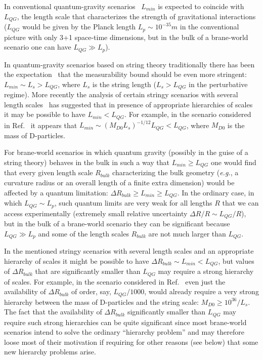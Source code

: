 In conventional quantum-gravity 
scenarios~\cite{wheely,padma,dharam94grf,gacmpla}
$L_{min}$ is expected to coincide with $L_{QG}$,
the length scale that characterizes the strength
of gravitational interactions ($L_{QG}$ would be given by the
Planck length $L_p \sim 10^{-35}m$
in the conventional picture with only 3+1
space-time dimensions, but in the bulk of a brane-world scenario
one can have $L_{QG} \gg L_p$).

In quantum-gravity scenarios based on string theory
traditionally there has been the expectation~\cite{venekonmen}  
that the measurability bound should be even more
stringent: $L_{min} \sim L_s > L_{QG}$,
where $L_s$ is the string length ($L_s > L_{QG}$ in the 
perturbative regime).
More recently the analysis of certain stringy scenarios
with several length scales~\cite{dbrscatt}  
has suggested that in presence of appropriate hierarchies
of scales it may be possible to have
$L_{min} < L_{QG}$.
For example, in the scenario considered in Ref.~\cite{dbrscatt}
it appears that $L_{min} \sim (M_{D0} L_s)^{-1/12} L_{QG} < L_{QG}$,
where $M_{D0}$ is the mass of D-particles.

For brane-world scenarios in which quantum gravity 
(possibly in the guise of a string theory) 
behaves in the bulk in such a way that
$L_{min} \ge L_{QG}$
one would find that 
every given length scale $R_{bulk}$ characterizing the bulk geometry
({\it e.g.}, a curvature radius or an overall length of a finite
extra dimension)
would be affected by a quantum 
limitation: $\Delta R_{bulk} \ge L_{min} \ge L_{QG}$.
In the ordinary case, in which $L_{QG} \sim L_p$,
such quantum limits are very weak
for all lengths $R$ that we can access experimentally
(extremely small relative uncertainty $\Delta R/R \sim L_{QG}/R$),
but in the bulk of a brane-world scenario they can be significant
because $L_{QG} \gg L_p$ and some
of the length
scales $R_{bulk}$ are not much larger than $L_{QG}$.

In the mentioned stringy scenarios with several length scales
and an appropriate hierarchy of scales 
it might be possible to have
$\Delta R_{bulk} \sim L_{min} < L_{QG}$,
but values of $\Delta R_{bulk}$ that are significantly
smaller than $L_{QG}$ may require a strong hierarchy of scales.
For example, in the scenario considered in Ref.~\cite{dbrscatt}
even just the availability of $\Delta R_{bulk}$ of order, say,
$L_{QG}/1000$, would already require a very strong hierarchy
between the mass of D-particles and the string scale:
$M_{D0} \ge 10^{36}/L_s$.
The fact that the availability of $\Delta R_{bulk}$
significantly smaller than $L_{QG}$ may require such strong
hierarchies can be quite significant since most brane-world
scenarios intend to solve the ordinary ``hierarchy problem''
and may therefore loose most of their motivation if
requiring for other reasons (see below) 
that some new hierarchy problems arise.

